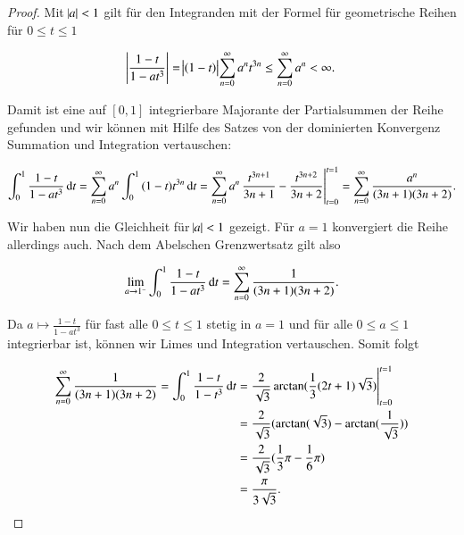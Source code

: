 \begin{proof}
  Mit $\abs{a}<1$ gilt für den Integranden mit der Formel für geometrische Reihen für \linebreak $0 \leq t \leq 1$

  \begin{equation*}
    \abs{\frac{1-t}{1-at^3}}
    ={\abs{(1-t)}}{\sum_{n=0}^\infty{a^n t^{3n}}}
    \leq \sum_{n=0}^\infty{a^n}
    < \infty.
  \end{equation*}

  Damit ist eine auf $[0,1]$ integrierbare Majorante der Partialsummen der Reihe gefunden und wir können mit Hilfe des Satzes von der dominierten Konvergenz Summation und Integration vertauschen:

  \begin{equation*}
    \int_0^1{\frac{1-t}{1-at^3}\dif t}
    =\sum_{n=0}^\infty{a^n\int_0^1{(1-t)t^{3n} \dif t}}
    =\sum_{n=0}^\infty{a^n\eval{\frac{t^{3n+1}}{3n+1} - \frac{t^{3n+2}}{3n+2}}_{t=0}^{t=1}}
    =\sum_{n=0}^\infty{\frac{a^n}{(3n+1)(3n+2)}}.
  \end{equation*}

  Wir haben nun die Gleichheit für $\abs{a}<1$ gezeigt. Für $a=1$ konvergiert die Reihe allerdings auch. Nach dem Abelschen Grenzwertsatz gilt also

  \begin{equation*}
    \lim_{a\to 1^-}\int_0^1{\frac{1-t}{1-at^3}\dif t}
    =\sum_{n=0}^\infty{\frac{1}{(3n+1)(3n+2)}}.
  \end{equation*}

  Da $a \mapsto \frac{1-t}{1-at^3}$ für fast alle $0 \leq t \leq 1$ stetig in $a=1$ und für alle $0 \leq a \leq 1$ integrierbar ist, können wir Limes und Integration vertauschen. Somit folgt

  \begin{equation*}
    \begin{split}
    \sum_{n=0}^\infty{\frac{1}{(3n+1)(3n+2)}}
    =\int_0^1{\frac{1-t}{1-t^3}\dif t}
    &=\eval{\frac{2}{\sqrt{3}}\arctan(\frac{1}{3}(2t+1)\sqrt{3})}_{t=0}^{t=1} \\
    &=\frac{2}{\sqrt{3}}(\arctan(\sqrt{3})-\arctan(\frac{1}{\sqrt{3}})) \\
    &=\frac{2}{\sqrt{3}}(\frac{1}{3} \pi- \frac{1}{6}\pi)\\
    &=\frac{\pi}{3\sqrt{3}}.
    \end{split}
  \end{equation*}
 \end{proof}
